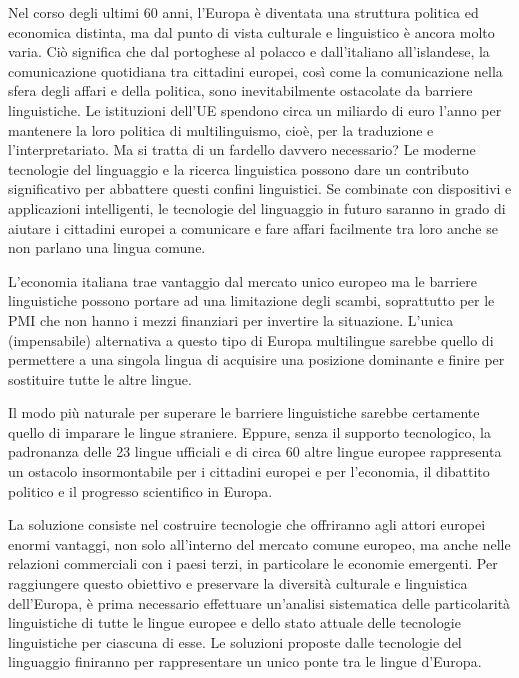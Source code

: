 \documentclass[]{../../metanetpaper}
\begin{document}
\begin{multicols}{2}
Nel corso degli ultimi 60 anni, l'Europa \`{e} diventata una struttura
politica ed economica distinta, ma dal punto di vista culturale e linguistico
\`{e} ancora molto varia. Ci\`{o} significa che dal portoghese al polacco e
dall'italiano all'islandese, la comunicazione quotidiana tra cittadini
europei, cos\`{i} come la comunicazione nella sfera degli affari e della
politica, sono inevitabilmente ostacolate da barriere linguistiche. Le
istituzioni dell'UE spendono circa un miliardo di euro l'anno per mantenere la
loro politica di multilinguismo, cio\`{e}, per la traduzione e
l'interpretariato. Ma si tratta di un fardello davvero necessario? Le moderne
tecnologie del linguaggio e la ricerca linguistica possono dare un contributo
significativo per abbattere questi confini linguistici. Se combinate con
dispositivi e applicazioni intelligenti, le tecnologie del linguaggio in
futuro saranno in grado di aiutare i cittadini europei a comunicare e fare
affari facilmente tra loro anche se non parlano una lingua comune.




L'economia italiana trae vantaggio dal mercato unico
europeo ma le barriere linguistiche
possono portare ad una limitazione degli scambi, soprattutto per le PMI che non hanno
i mezzi finanziari per invertire la situazione. L'unica (impensabile)
alternativa a questo tipo di Europa multilingue sarebbe quello di permettere a
una singola lingua di acquisire una posizione dominante e finire per
sostituire tutte le altre lingue.

Il modo pi\`{u} naturale per superare le barriere linguistiche sarebbe
certamente quello di imparare le lingue straniere. Eppure, senza il supporto
tecnologico, la padronanza delle 23 lingue ufficiali e di circa 60 altre
lingue europee rappresenta un ostacolo insormontabile per i cittadini europei
e per l'economia, il dibattito politico e il progresso scientifico in Europa.

La soluzione consiste nel costruire tecnologie che offriranno agli attori
europei enormi vantaggi, non solo all'interno del mercato comune europeo, ma
anche nelle relazioni commerciali con i paesi terzi, in particolare le
economie emergenti. Per raggiungere questo obiettivo e preservare la
diversit\`{a} culturale e linguistica dell'Europa, \`{e} prima necessario
effettuare un'analisi sistematica delle particolarit\`{a} linguistiche di
tutte le lingue europee e dello stato attuale delle tecnologie linguistiche
per ciascuna di esse. Le soluzioni proposte dalle tecnologie del linguaggio
finiranno per rappresentare un unico ponte tra le lingue d'Europa.


\end{multicols}
\end{document}
